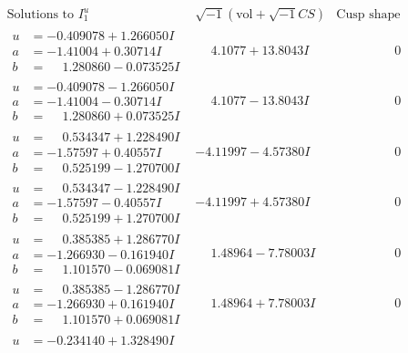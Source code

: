 \documentclass[1p]{elsarticle_modified}
\theoremstyle{definition}
\newcommand{\I}{\sqrt{-1}}
\begin{document}
$$\begin{array}{c|c|c}
\text{Solutions to }I^u_{1}& \I (\text{vol} + \sqrt{-1}CS) & \text{Cusp shape}\\
 \hline 
\begin{aligned}
u &= -0.409078 + 1.266050 I \\
a &= -1.41004 + 0.30714 I \\
b &= \phantom{-}1.280860 - 0.073525 I\end{aligned}
 & \phantom{-}4.1077 + 13.8043 I & \phantom{-0.000000 } 0 \\ \hline\begin{aligned}
u &= -0.409078 - 1.266050 I \\
a &= -1.41004 - 0.30714 I \\
b &= \phantom{-}1.280860 + 0.073525 I\end{aligned}
 & \phantom{-}4.1077 - 13.8043 I & \phantom{-0.000000 } 0 \\ \hline\begin{aligned}
u &= \phantom{-}0.534347 + 1.228490 I \\
a &= -1.57597 + 0.40557 I \\
b &= \phantom{-}0.525199 - 1.270700 I\end{aligned}
 & -4.11997 - 4.57380 I & \phantom{-0.000000 } 0 \\ \hline\begin{aligned}
u &= \phantom{-}0.534347 - 1.228490 I \\
a &= -1.57597 - 0.40557 I \\
b &= \phantom{-}0.525199 + 1.270700 I\end{aligned}
 & -4.11997 + 4.57380 I & \phantom{-0.000000 } 0 \\ \hline\begin{aligned}
u &= \phantom{-}0.385385 + 1.286770 I \\
a &= -1.266930 - 0.161940 I \\
b &= \phantom{-}1.101570 - 0.069081 I\end{aligned}
 & \phantom{-}1.48964 - 7.78003 I & \phantom{-0.000000 } 0 \\ \hline\begin{aligned}
u &= \phantom{-}0.385385 - 1.286770 I \\
a &= -1.266930 + 0.161940 I \\
b &= \phantom{-}1.101570 + 0.069081 I\end{aligned}
 & \phantom{-}1.48964 + 7.78003 I & \phantom{-0.000000 } 0 \\ \hline\begin{aligned}
u &= -0.234140 + 1.328490 I \\

\end{aligned}
\end{array}$$
\end{document}
